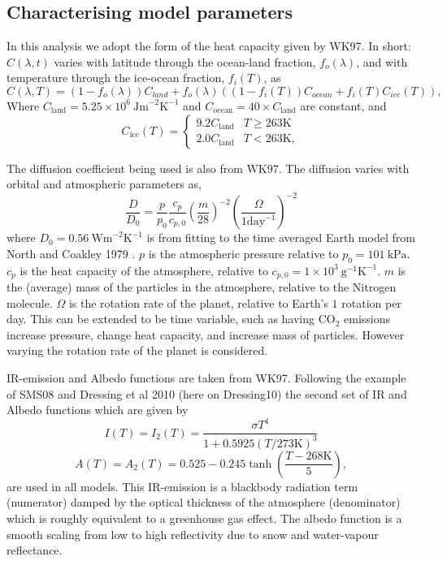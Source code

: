 \documentclass[12pt, onecolumn]{revtex4-2}    %
\newcommand{\heatcap}{\ensuremath{\ \text{Jm}^{-2} \text{K}^{-1}}}
\newcommand{\diffusion}{\ensuremath{\ \text{Wm}^{-2} \text{K}^{-1}}}
\begin{document}
\subsection{Characterising model parameters} \label{ssec:model_params}

In this analysis we adopt the form of the heat capacity given by WK97.
In short: $C(\lambda, t)$ varies with latitude through the ocean-land fraction, $f_o(\lambda)$, and with temperature through the ice-ocean fraction, $f_i(T)$, as
$$
    C(\lambda, T) = (1 - f_o(\lambda)) C_{land} + f_o(\lambda) ((1-f_i(T)) C_{ocean} + f_i(T) C_{ice}(T)),
$$
Where $C_{\text{land}} = 5.25\times10^6 \heatcap$ and $C_{\text{ocean}} = 40 \times C_{\text{land}}$ are constant, and
$$
    C_{\text{ice}}(T) =
    \begin{cases}
        9.2 C_\text{land} & T \ge 263\text{K} \\
        2.0 C_\text{land} & T < 263\text{K},
    \end{cases}
$$

The diffusion coefficient being used is also from WK97. The diffusion varies with orbital and atmospheric parameters as,
$$
    \frac{D}{D_0} = \frac{p}{p_0} \frac{c_p}{c_{p,0}} \left(\frac{m}{28}\right)^{-2} \left(\frac{\Omega}{1 \text{day}^{-1}}\right)^{-2}
$$
where $D_0 = 0.56 \diffusion$ is from fitting to the time averaged Earth model from North and Coakley 1979 \cite{NC79}.
$p$ is the atmospheric pressure relative to $p_0 = 101 \ \text{kPa}$.
$c_p$ is the heat capacity of the atmosphere, relative to $c_{p,0} = 1\times10^3 \ \text{g}^{-1} \text{K}^{-1}$.
$m$ is the (average) mass of the particles in the atmosphere, relative to the Nitrogen molecule.
$\Omega$ is the rotation rate of the planet, relative to Earth's $1$ rotation per day.
This can be extended to be time variable, such as having CO$_2$ emissions increase pressure, change heat capacity, and increase mass of particles.
However varying the rotation rate of the planet is considered.

IR-emission and Albedo functions are taken from WK97. Following the example of SMS08 and Dressing et al 2010 (here on Dressing10) \cite{Dressing10} the second set of IR and Albedo functions which are given by
$$
    I(T) = I_2(T) = \frac{\sigma T^4}{1 + 0.5925 (T / 273 \text{K}) ^ 3}
$$
$$
    A(T) = A_2(T) = 0.525 - 0.245 \tanh\left(\frac{T - 268 \text{K}}{5}\right),
$$
are used in all models.
This IR-emission is a blackbody radiation term (numerator) damped by the optical thickness of the atmosphere (denominator) which is roughly equivalent to a greenhouse gas effect.
The albedo function is a smooth scaling from low to high reflectivity due to snow and water-vapour reflectance.
\end{document}
